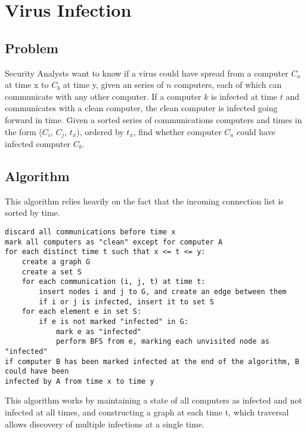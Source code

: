 \documentclass[titlepage]{article}
\numberwithin{equation}{subsection}
\begin{document}
\section{Virus Infection}
\subsection{Problem}
Security Analysts want to know if a virus could have spread from a computer
$C_a$ at time x to $C_b$ at time y, given an series of $n$ computers,
each of which can communicate with any other computer. If a computer $k$
is infected at time $t$ and communicates with a clean computer, the clean computer
is infected going forward in time. Given a sorted series of communications computers
and times in the form ($C_i$, $C_j$, $t_x$), ordered by $t_x$, find whether
computer $C_a$ could have infected computer $C_b$.
\subsection{Algorithm}
This algorithm relies heavily on the fact that the incoming connection
list is sorted by time.
\\
\begin{minipage}{\linewidth}
\begin{lstlisting}
discard all communications before time x
mark all computers as "clean" except for computer A
for each distinct time t such that x <= t <= y:
    create a graph G
    create a set S 
    for each communication (i, j, t) at time t:
        insert nodes i and j to G, and create an edge between them
        if i or j is infected, insert it to set S
    for each element e in set S:
        if e is not marked "infected" in G:
            mark e as "infected"
            perform BFS from e, marking each unvisited node as "infected"
if computer B has been marked infected at the end of the algorithm, B could have been
infected by A from time x to time y
\end{lstlisting}
\end{minipage}
This algorithm works by maintaining a state of all computers as infected
and not infected at all times, and constructing a graph at each time t,
which traversal allows discovery of multiple infections at a single time.
\end{document}
